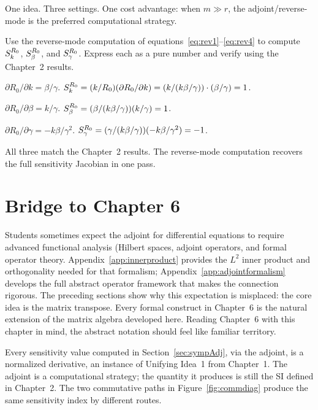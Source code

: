 One idea. Three settings. One cost advantage: when $m \gg r$,
the adjoint/reverse-mode is the preferred computational strategy.

\begin{selfcheck}
Use the reverse-mode computation of equations~\eqref{eq:rev1}--\eqref{eq:rev4}
to compute $S_{k}^{R_0}$, $S_{\beta}^{R_0}$, and $S_{\gamma}^{R_0}$.
Express each as a pure number and verify using the Chapter~2 results.
\end{selfcheck}
\begin{scAnswer}
$\partial R_0/\partial k = \beta/\gamma$.
$S_{k}^{R_0} = (k/R_0)(\partial R_0/\partial k)
= (k/(k\beta/\gamma))\cdot(\beta/\gamma) = 1$.

$\partial R_0/\partial\beta = k/\gamma$.
$S_{\beta}^{R_0} = (\beta/(k\beta/\gamma))(k/\gamma) = 1$.

$\partial R_0/\partial\gamma = -k\beta/\gamma^2$.
$S_{\gamma}^{R_0} = (\gamma/(k\beta/\gamma))(-k\beta/\gamma^2) = -1$.

All three match the Chapter~2 results. The reverse-mode computation
recovers the full sensitivity Jacobian in one pass.
\end{scAnswer}

\section{Bridge to Chapter 6}
\label{sec:bridge}

Students sometimes expect the adjoint for differential equations
to require advanced functional analysis (Hilbert spaces,
adjoint operators, and formal operator theory.
Appendix~\ref{app:innerproduct} provides the $L^2$ inner product and
orthogonality needed for that formalism; Appendix~\ref{app:adjointformalism}
develops the full abstract operator framework that makes the connection rigorous.
The preceding sections show why this expectation is misplaced:
the core idea is the matrix transpose.
Every formal construct in Chapter~6 is the natural extension
of the matrix algebra developed here.
Reading Chapter~6 with this chapter in mind, the abstract
notation should feel like familiar territory.

 Every sensitivity value computed in
Section~\ref{sec:sympAdj}, via the adjoint, is a normalized
derivative, an instance of Unifying Idea~1 from Chapter~1.
The adjoint is a computational strategy; the quantity it produces
is still the SI defined in Chapter~2.
The two commutative paths in Figure~\ref{fig:commdiag} produce
the same sensitivity index by different routes.

